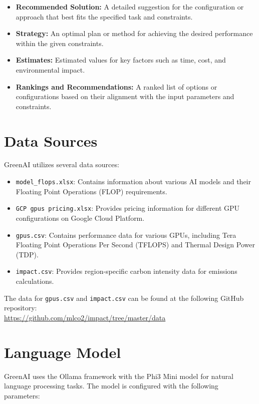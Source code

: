 \documentclass{report}
\begin{document}
\begin{itemize}
    \item \textbf{Recommended Solution:} A detailed suggestion for the configuration or approach that best fits the specified task and constraints.
    \item \textbf{Strategy:} An optimal plan or method for achieving the desired performance within the given constraints.
    \item \textbf{Estimates:} Estimated values for key factors such as time, cost, and environmental impact.
    \item \textbf{Rankings and Recommendations:} A ranked list of options or configurations based on their alignment with the input parameters and constraints.
\end{itemize}

\section{Data Sources}

GreenAI utilizes several data sources:

\begin{itemize}
    \item \texttt{model\_flops.xlsx}: Contains information about various AI models and their Floating Point Operations (FLOP) requirements.
    \item \texttt{GCP gpus pricing.xlsx}: Provides pricing information for different GPU configurations on Google Cloud Platform.
    \item \texttt{gpus.csv}: Contains performance data for various GPUs, including Tera Floating Point Operations Per Second (TFLOPS) and Thermal Design Power (TDP).
    \item \texttt{impact.csv}: Provides region-specific carbon intensity data for emissions calculations.
\end{itemize}

\noindent The data for \texttt{gpus.csv} and \texttt{impact.csv} can be found at the following GitHub repository: \\
\url{https://github.com/mlco2/impact/tree/master/data}


\section{Language Model}

GreenAI uses the Ollama framework with the Phi3 Mini model for natural language processing tasks. The model is configured with the following parameters:
\end{document}
